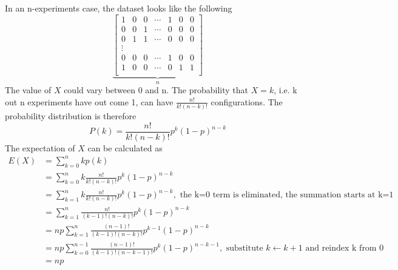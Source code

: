 \documentclass[12pt, oneside]{article}
\begin{document}
In an n-experiments case, the dataset looks like the following
\[
\underbrace{
\begin{bmatrix}
    1 & 0  &0 &\cdots &1 & 0  &0  \\
    0 & 0  &1 &\cdots &0 & 0  &0 \\
    0 & 1  &1 &\cdots &0 & 0  &0 \\
    \vdots \\
    0 &0  &0 &\cdots &1& 0  &0\\
    1 & 0  &0 &\cdots &0 & 1 &1\\
\end{bmatrix}
}_{n}
\]
The value of $X$ could vary between 0 and n. The probability that $X=k$, i.e. k out n experiments have out come 1, can have $\frac{n!}{k!(n-k)!}$ configurations. The probability distribution is therefore
$$P(k)=\frac{n!}{k!(n-k)!}p^k(1-p)^{n-k}$$
The expectation of $X$ can be calculated as
\begin{align*}
E(X)&=\sum\limits_{k=0}^{n}kp(k)\\
&=\sum\limits_{k=0}^{n}k\frac{n!}{k!(n-k)!}p^k(1-p)^{n-k}\\ 
&=\sum\limits_{k=1}^{n}k\frac{n!}{k!(n-k)!}p^{k}(1-p)^{n-k}, \text{ the k=0 term is eliminated, the summation starts at k=1}\\
&=\sum\limits_{k=1}^{n}\frac{n!}{(k-1)!(n-k)!}p^{k}(1-p)^{n-k}\\
&=np\sum\limits_{k=1}^{n}\frac{(n-1)!}{(k-1)!(n-k)!}p^{k-1}(1-p)^{n-k}\\
&=np\sum\limits_{k=0}^{n-1}\frac{(n-1)!}{(k-1)!(n-k-1)!}p^{k}(1-p)^{n-k-1}, \text{ substitute }k\leftarrow k+1 \text{ and reindex k from 0}\\
&=np
\end{align*}
\end{document}
